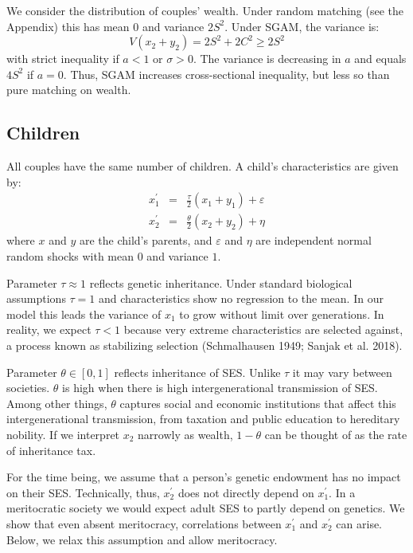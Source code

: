 \documentclass[
]{article}
\theoremstyle{definition}
\theoremstyle{definition}
\theoremstyle{definition}
\theoremstyle{definition}
\theoremstyle{remark}
\begin{document}
We consider the distribution of couples' wealth. Under random matching
(see the Appendix) this has mean \(0\) and variance \(2S^2\). Under SGAM, the variance is:
\[
V(x_{2}+y_{2}) = 2S^{2} + 2C^{2} \ge 2S^{2} 
\]
with strict inequality if \(a < 1\) or \(\sigma > 0\). The variance is decreasing in
\(a\) and equals \(4S^2\) if \(a = 0\). Thus, SGAM increases cross-sectional inequality,
but less so than pure matching on wealth.

\subsection{Children}\label{children}

All couples have the same number of children. A child's characteristics are
given by:
\begin{eqnarray}
x_{1}^{\prime } &=&\frac{\tau }{2}\left( x_{1}+y_{1}\right) +\varepsilon
\label{Chil} \\
x_{2}^{\prime } &=&\frac{\theta }{2}\left( x_{2}+y_{2}\right) +\eta 
\nonumber
\end{eqnarray}
where \(x\) and \(y\) are the child's parents, and \(\varepsilon\) and \(\eta\) are
independent normal random shocks with mean \(0\) and variance \(1\).

Parameter \(\tau \approx 1\) reflects genetic inheritance. Under standard biological
assumptions \(\tau = 1\) and characteristics show no regression to the mean. In our
model this leads the variance of \(x_1\) to grow without limit over generations.
In reality, we expect \(\tau < 1\) because very extreme characteristics are
selected against, a process known as stabilizing selection
(Schmalhausen 1949; Sanjak et al. 2018).

Parameter \(\theta \in [0, 1]\) reflects inheritance of SES. Unlike \(\tau\) it may vary
between societies. \(\theta\) is high when there is high intergenerational
transmission of SES. Among other things, \(\theta\) captures social and economic
institutions
that affect this intergenerational transmission, from taxation and
public education to hereditary nobility. If we interpret \(x_2\) narrowly as
wealth, \(1 - \theta\) can be thought of as the rate of inheritance tax.

For the time being, we assume that a person's genetic endowment has no impact on
their SES. Technically, thus, \(x_{2}^\prime\) does not directly depend on
\(x_{1}^\prime\). In a meritocratic society we would expect adult SES to partly depend
on genetics. We show that even absent meritocracy, correlations between \(x_1^\prime\) and
\(x_{2}^\prime\) can arise. Below, we relax this assumption and allow meritocracy.
\end{document}
